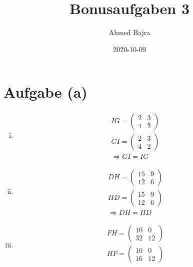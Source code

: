\documentclass{article}
\title{Bonusaufgaben 3}
\author{Ahmed Bajra}
\date{2020-10-09}
\begin{document}
    \maketitle

    \section{Aufgabe (a)}

    \begin{enumerate}[(i)]
        \item 
        \begin{align*}
            IG = \begin{pmatrix}
                2 & 3\\
                4 & 2
            \end{pmatrix} \\
            GI = \begin{pmatrix}
                2 & 3 \\
                4 & 2
            \end{pmatrix}\\
            \Rightarrow GI=IG
        \end{align*}
        \item 
        \begin{align*}
            DH = \begin{pmatrix}
                15 & 9\\
                12 & 6
            \end{pmatrix} \\
            HD = \begin{pmatrix}
                15 & 9\\
                12 & 6
            \end{pmatrix}\\
            \Rightarrow DH=HD
        \end{align*}
        \item 
        \begin{align*}
            FH = \begin{pmatrix}
                10 & 0\\
                32 & 12
            \end{pmatrix} \\
            HF = \begin{pmatrix}
                10 & 0\\
                16 & 12
            \end{pmatrix}\\

\end{align*}
\end{enumerate}
\end{document}
